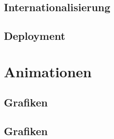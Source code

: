 \subsection{Internationalisierung}

\subsection{Deployment}

\section{Animationen}

\subsection{Grafiken}

\subsection{Grafiken}

